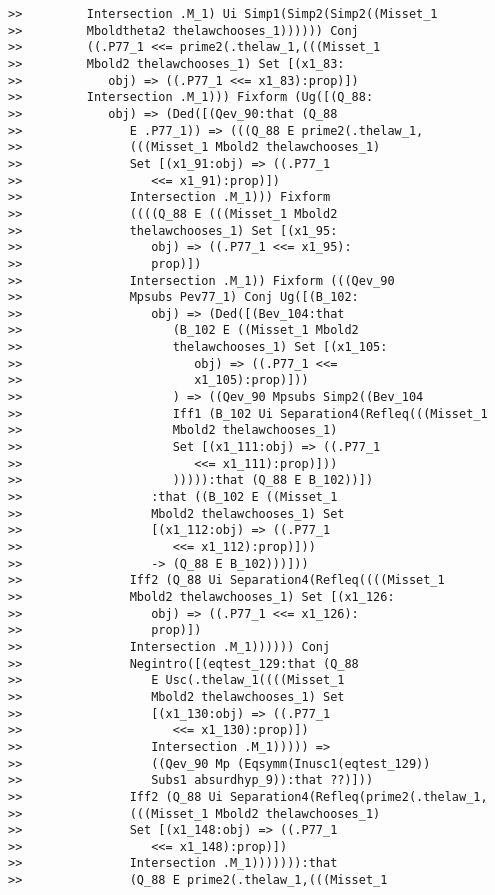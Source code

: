 \documentclass[12pt]{article}
\begin{document}
\begin{verbatim}
>>         Intersection .M_1) Ui Simp1(Simp2(Simp2((Misset_1
>>         Mboldtheta2 thelawchooses_1)))))) Conj
>>         ((.P77_1 <<= prime2(.thelaw_1,(((Misset_1
>>         Mbold2 thelawchooses_1) Set [(x1_83:
>>            obj) => ((.P77_1 <<= x1_83):prop)])
>>         Intersection .M_1))) Fixform (Ug([(Q_88:
>>            obj) => (Ded([(Qev_90:that (Q_88
>>               E .P77_1)) => (((Q_88 E prime2(.thelaw_1,
>>               (((Misset_1 Mbold2 thelawchooses_1)
>>               Set [(x1_91:obj) => ((.P77_1
>>                  <<= x1_91):prop)])
>>               Intersection .M_1))) Fixform
>>               ((((Q_88 E (((Misset_1 Mbold2
>>               thelawchooses_1) Set [(x1_95:
>>                  obj) => ((.P77_1 <<= x1_95):
>>                  prop)])
>>               Intersection .M_1)) Fixform (((Qev_90
>>               Mpsubs Pev77_1) Conj Ug([(B_102:
>>                  obj) => (Ded([(Bev_104:that
>>                     (B_102 E ((Misset_1 Mbold2
>>                     thelawchooses_1) Set [(x1_105:
>>                        obj) => ((.P77_1 <<=
>>                        x1_105):prop)]))
>>                     ) => ((Qev_90 Mpsubs Simp2((Bev_104
>>                     Iff1 (B_102 Ui Separation4(Refleq(((Misset_1
>>                     Mbold2 thelawchooses_1)
>>                     Set [(x1_111:obj) => ((.P77_1
>>                        <<= x1_111):prop)]))
>>                     ))))):that (Q_88 E B_102))])
>>                  :that ((B_102 E ((Misset_1
>>                  Mbold2 thelawchooses_1) Set
>>                  [(x1_112:obj) => ((.P77_1
>>                     <<= x1_112):prop)]))
>>                  -> (Q_88 E B_102)))]))
>>               Iff2 (Q_88 Ui Separation4(Refleq((((Misset_1
>>               Mbold2 thelawchooses_1) Set [(x1_126:
>>                  obj) => ((.P77_1 <<= x1_126):
>>                  prop)])
>>               Intersection .M_1)))))) Conj
>>               Negintro([(eqtest_129:that (Q_88
>>                  E Usc(.thelaw_1((((Misset_1
>>                  Mbold2 thelawchooses_1) Set
>>                  [(x1_130:obj) => ((.P77_1
>>                     <<= x1_130):prop)])
>>                  Intersection .M_1))))) =>
>>                  ((Qev_90 Mp (Eqsymm(Inusc1(eqtest_129))
>>                  Subs1 absurdhyp_9)):that ??)]))
>>               Iff2 (Q_88 Ui Separation4(Refleq(prime2(.thelaw_1,
>>               (((Misset_1 Mbold2 thelawchooses_1)
>>               Set [(x1_148:obj) => ((.P77_1
>>                  <<= x1_148):prop)])
>>               Intersection .M_1))))))):that
>>               (Q_88 E prime2(.thelaw_1,(((Misset_1

\end{verbatim}
\end{document}
